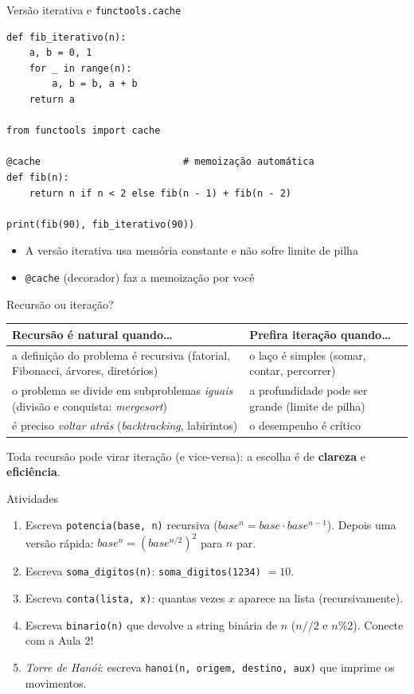 \documentclass[aspectratio=169,10pt,t]{beamer}
\begin{document}
\begin{frame}[fragile]{Versão iterativa e \texttt{functools.cache}}
\begin{lstlisting}
def fib_iterativo(n):
    a, b = 0, 1
    for _ in range(n):
        a, b = b, a + b
    return a

from functools import cache

@cache                         # memoização automática
def fib(n):
    return n if n < 2 else fib(n - 1) + fib(n - 2)

print(fib(90), fib_iterativo(90))
\end{lstlisting}
  \begin{itemize}
    \item A versão iterativa usa memória constante e não sofre limite de pilha
    \item \texttt{@cache} (decorador) faz a memoização por você
  \end{itemize}
\end{frame}

\begin{frame}{Recursão ou iteração?}
  \centering\small
  \begin{tabular}{p{5.3cm}p{5.3cm}}
    \toprule
    \textbf{Recursão é natural quando\ldots} & \textbf{Prefira iteração quando\ldots}\\
    \midrule
    a definição do problema é recursiva (fatorial, Fibonacci, árvores, diretórios) & o laço é simples (somar, contar, percorrer)\\
    o problema se divide em subproblemas \emph{iguais} (divisão e conquista: \emph{mergesort}) & a profundidade pode ser grande (limite de pilha)\\
    é preciso \emph{voltar atrás} (\emph{backtracking}, labirintos) & o desempenho é crítico\\
    \bottomrule
  \end{tabular}
  \vspace{1.5ex}

  \normalsize Toda recursão pode virar iteração (e vice-versa): a escolha é de \textbf{clareza} e \textbf{eficiência}.
\end{frame}

\begin{frame}{Atividades}
  \begin{enumerate}
    \item Escreva \texttt{potencia(base, n)} recursiva (\(base^n = base\cdot base^{n-1}\)). Depois uma versão rápida: \(base^n=(base^{n/2})^2\) para \(n\) par.
    \item Escreva \texttt{soma\_digitos(n)}: \texttt{soma\_digitos(1234)} \(=10\).
    \item Escreva \texttt{conta(lista, x)}: quantas vezes \(x\) aparece na lista (recursivamente).
    \item Escreva \texttt{binario(n)} que devolve a string binária de \(n\) (\(n//2\) e \(n\%2\)). Conecte com a Aula 2!
    \item \emph{Torre de Hanói}: escreva \texttt{hanoi(n, origem, destino, aux)} que imprime os movimentos.
  \end{enumerate}
\end{frame}
\end{document}
